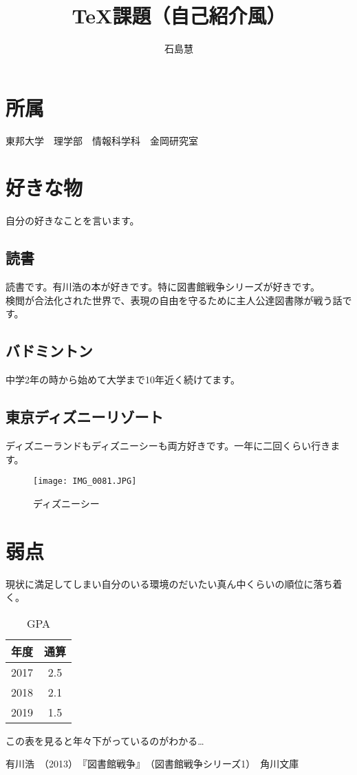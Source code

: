 \documentclass[dvipdfmx]{jsarticle}
\begin{document}
\title{TeX課題（自己紹介風）}
\author{石島慧}
\maketitle

\section{所属}
東邦大学　理学部　情報科学科　金岡研究室

\section{好きな物}
自分の好きなことを言います。

\subsection{読書}
読書です。有川浩の本が好きです。特に図書館戦争シリーズが好きです。\\
検閲が合法化された世界で、表現の自由を守るために主人公達図書隊が戦う話です。\cite{1}

\subsection{バドミントン}
中学2年の時から始めて大学まで10年近く続けてます。

\subsection{東京ディズニーリゾート}
ディズニーランドもディズニーシーも両方好きです。一年に二回くらい行きます。
\begin{figure}[htbp]
\begin{center}
\texttt{[image: IMG\_0081.JPG]}
\caption{ディズニーシー}
\end{center}
\end{figure}

\section{弱点}
現状に満足してしまい自分のいる環境のだいたい真ん中くらいの順位に落ち着く。\\
\begin{table}[h]
	\begin{center}
	\caption{GPA}
		\begin{tabular}{|c|c|} \hline
			年度 & 通算 \\ \hline
			2017 & 2.5 \\\hline
			2018 & 2.1 \\\hline
			2019 & 1.5 \\ \hline
		\end{tabular}
	\end{center}
\end{table}
この表を見ると年々下がっているのがわかる…


\begin{thebibliography}{1}
   有川浩　（2013）　『図書館戦争』　（図書館戦争シリーズ1）　角川文庫　
\end{thebibliography}


\enddocument
\end{document}
